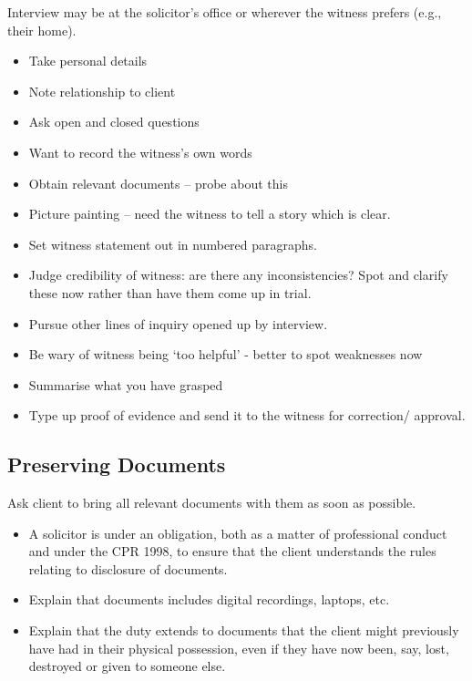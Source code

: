 \documentclass[
]{article}
\providecommand{\tightlist}{%
  \setlength{\itemsep}{0pt}\setlength{\parskip}{0pt}}
\begin{document}
Interview may be at the solicitor's office or wherever the witness
prefers (e.g., their home).

\begin{itemize}
\tightlist
\item
  Take personal details
\item
  Note relationship to client
\item
  Ask open and closed questions
\item
  Want to record the witness's own words
\item
  Obtain relevant documents -- probe about this
\item
  Picture painting -- need the witness to tell a story which is clear.
\item
  Set witness statement out in numbered paragraphs.
\item
  Judge credibility of witness: are there any inconsistencies? Spot and
  clarify these now rather than have them come up in trial.
\item
  Pursue other lines of inquiry opened up by interview.
\item
  Be wary of witness being `too helpful' - better to spot weaknesses now
\item
  Summarise what you have grasped
\item
  Type up proof of evidence and send it to the witness for correction/
  approval.
\end{itemize}

\hypertarget{preserving-documents}{%
\subsection{Preserving Documents}\label{preserving-documents}}

Ask client to bring all relevant documents with them as soon as
possible.

\begin{itemize}
\tightlist
\item
  A solicitor is under an obligation, both as a matter of professional
  conduct and under the CPR 1998, to ensure that the client understands
  the rules relating to disclosure of documents.
\item
  Explain that documents includes digital recordings, laptops, etc.
\item
  Explain that the duty extends to documents that the client might
  previously have had in their physical possession, even if they have
  now been, say, lost, destroyed or given to someone else.
\end{itemize}
\end{document}
